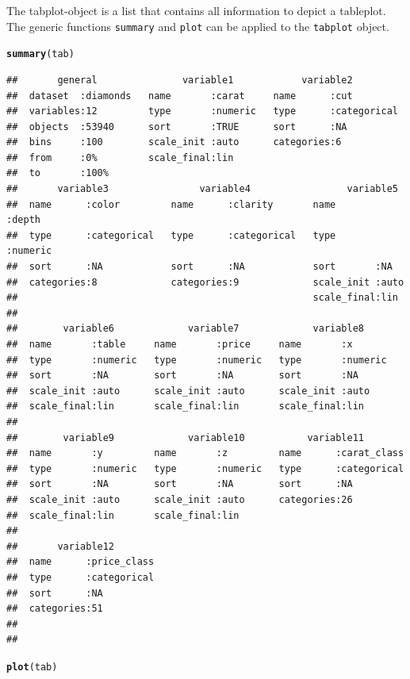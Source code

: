 \documentclass[11pt, fleqn, a4paper]{article}\usepackage{graphicx, color}
\makeatletter
\newcommand{\hlfunctioncall}[1]{\textcolor[rgb]{0.501960784313725,0,0.329411764705882}{\textbf{#1}}}%
\newenvironment{kframe}{%
 \def\at@end@of@kframe{}%
 \ifinner\ifhmode%
  \def\at@end@of@kframe{\end{minipage}}%
  \begin{minipage}{\columnwidth}%
 \fi\fi%
 \def\FrameCommand##1{\hskip\@totalleftmargin \hskip-\fboxsep
 \colorbox{shadecolor}{##1}\hskip-\fboxsep
     \hskip-\linewidth \hskip-\@totalleftmargin \hskip\columnwidth}%
 \MakeFramed {\advance\hsize-\width
   \@totalleftmargin\z@ \linewidth\hsize
   \@setminipage}}%
 {\par\unskip\endMakeFramed%
 \at@end@of@kframe}
\newenvironment{knitrout}{}{} %
\makeatother
\begin{document}
The tabplot-object is a list that contains all information to depict a tableplot. The generic functions {\tt summary} and {\tt plot} can be applied to the {\tt tabplot} object.

\begin{knitrout}\scriptsize
{}\color{fgcolor}\begin{kframe}
\begin{alltt}
\hlfunctioncall{summary}(tab)
\end{alltt}
\begin{verbatim}
##       general               variable1            variable2          
##  dataset  :diamonds   name       :carat     name      :cut          
##  variables:12         type       :numeric   type      :categorical  
##  objects  :53940      sort       :TRUE      sort      :NA           
##  bins     :100        scale_init :auto      categories:6            
##  from     :0%         scale_final:lin                               
##  to       :100%                                                     
##       variable3                variable4                 variable5      
##  name      :color         name      :clarity       name       :depth    
##  type      :categorical   type      :categorical   type       :numeric  
##  sort      :NA            sort      :NA            sort       :NA       
##  categories:8             categories:9             scale_init :auto     
##                                                    scale_final:lin      
##                                                                         
##        variable6             variable7             variable8      
##  name       :table     name       :price     name       :x        
##  type       :numeric   type       :numeric   type       :numeric  
##  sort       :NA        sort       :NA        sort       :NA       
##  scale_init :auto      scale_init :auto      scale_init :auto     
##  scale_final:lin       scale_final:lin       scale_final:lin      
##                                                                   
##        variable9             variable10           variable11         
##  name       :y         name       :z         name      :carat_class  
##  type       :numeric   type       :numeric   type      :categorical  
##  sort       :NA        sort       :NA        sort      :NA           
##  scale_init :auto      scale_init :auto      categories:26           
##  scale_final:lin       scale_final:lin                               
##                                                                      
##       variable12         
##  name      :price_class  
##  type      :categorical  
##  sort      :NA           
##  categories:51           
##                          
## 
\end{verbatim}
\begin{alltt}
\hlfunctioncall{plot}(tab)
\end{alltt}
\end{kframe}
\end{knitrout}
\end{document}
